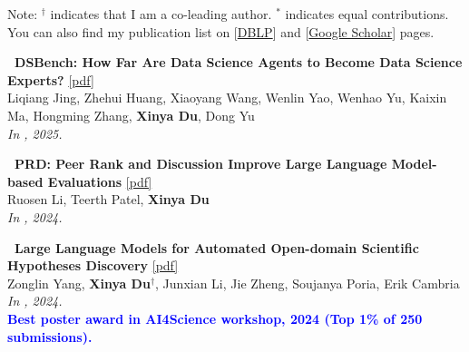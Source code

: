 \noindent Note: $^{\dagger}$ indicates that I am a co-leading author. $^{*}$ indicates equal contributions. \\
You can also find my publication list on [\href{https://dblp.org/pid/200/8114.html}{DBLP}] and [\href{https://scholar.google.com/citations?hl=en&user=R-lKQqkAAAAJ&view_op=list_works&sortby=pubdate}{Google Scholar}] pages.
\vspace{4mm}

\begin{enumerate}[{[}1{]},leftmargin=*]


\item 
{\bf\ DSBench: How Far Are Data Science Agents to Become Data Science Experts?} 
\href{https://arxiv.org/pdf/2409.07703}{{{[pdf]}}} \\
     Liqiang Jing, Zhehui Huang, Xiaoyang Wang, Wenlin Yao, Wenhao Yu, Kaixin Ma, Hongming Zhang, \textbf{Xinya Du}, Dong Yu \\
{\it In \ICLR, 2025.} \\




\item 
{\bf\ PRD: Peer Rank and Discussion Improve Large Language Model-based Evaluations} 
\href{https://openreview.net/pdf?id=YVD1QqWRaj}{{{[pdf]}}} \\
      Ruosen Li, Teerth Patel, \textbf{Xinya Du} \\
{\it In \TMLR, 2024.} \\


\item 
{\bf\ Large Language Models for Automated Open-domain Scientific Hypotheses Discovery} 
\href{https://aclanthology.org/2024.findings-acl.804.pdf}{{[pdf]}} \\
Zonglin Yang, \textbf{Xinya Du}$^{\dagger}$, Junxian Li, Jie Zheng, Soujanya Poria, Erik Cambria \\
{\it In \ACLfinding, 2024.} \\
% 
{\textcolor{blue}{\textbf{Best poster award in AI4Science workshop, 2024 (Top 1\% of 250 submissions).}}} \\




\end{enumerate}
